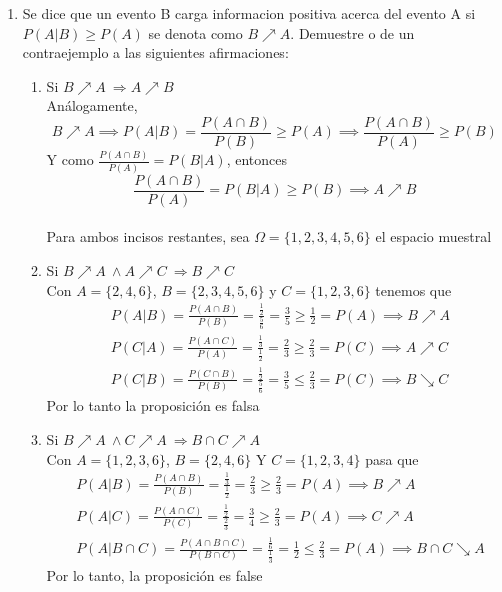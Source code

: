 \documentclass[12pt,a4paper]{report}
\begin{document}
\begin{enumerate}
{\begin{enumerate}[label=\alph*) ]
   \item {
 Se dice que un evento B carga informacion positiva acerca del evento A si
 $P(A|B) \geq P(A)$ se denota como $B \nearrow A$. Demuestre o de un contraejemplo a las siguientes afirmaciones:
 \begin{enumerate}
 \item{
 	Si $B\nearrow A \ \Rightarrow A\nearrow B$\\
	Análogamente,
	\[B \nearrow A \implies P(A|B) = \frac{P(A \cap B)}{P(B)} \geq P(A) \implies \frac{P(A \cap B)}{P(A)} \geq P(B)\]
	Y como $\frac{P(A \cap B)}{P(A)} = P(B|A)$, entonces
	\[\frac{P(A \cap B)}{P(A)} = P(B|A) \geq P(B) \implies A \nearrow B\]
	}\\

	Para ambos incisos restantes, sea $\Omega = \{1,2, 3, 4, 5, 6\}$ el espacio muestral
 \item{
 		Si $B \nearrow A \ \wedge A \nearrow C \ \Rightarrow B \nearrow C$\\
		Con $A = \{2, 4, 6\}$, $B = \{2, 3, 4, 5, 6\}$ y $C = \{1, 2, 3, 6\}$ tenemos que
		\begin{align*}
			&P(A|B) = \frac{P(A \cap B)}{P(B)} = \frac{\frac{1}{2}}{\frac{5}{6}}
			= \frac{3}{5} \geq \frac{1}{2} = P(A) \implies B \nearrow A \\
			&P(C|A) = \frac{P(A \cap C)}{P(A)} = \frac{\frac{1}{3}}{\frac{1}{2}}
			= \frac{2}{3} \geq \frac{2}{3} = P(C) \implies A \nearrow C \\
			&P(C|B) = \frac{P(C \cap B)}{P(B)} = \frac{\frac{1}{2}}{\frac{5}{6}}
			= \frac{3}{5} \leq \frac{2}{3} = P(C) \implies B \searrow C
		\end{align*}
		Por lo tanto la proposición es falsa\\
	}
 \item{
 		Si $B \nearrow A \ \wedge C \nearrow A \ \Rightarrow B\cap C \nearrow A$\\
		Con $A = \{1, 2, 3, 6\}$, $B = \{2, 4, 6\}$ Y $C = \{1, 2, 3, 4\}$ pasa que
		\begin{align*}
			&P(A|B) = \frac{P(A \cap B)}{P(B)} = \frac{\frac{1}{3}}{\frac{1}{2}}
			= \frac{2}{3} \geq \frac{2}{3} = P(A) \implies B \nearrow A\\
			&P(A|C) = \frac{P(A \cap C)}{P(C)} = \frac{\frac{1}{2}}{\frac{2}{3}}
			= \frac{3}{4} \geq \frac{2}{3} = P(A) \implies C \nearrow A\\
			&P(A|B \cap C) = \frac{P(A \cap B \cap C)}{P(B \cap C)} = \frac{\frac{1}{6}}{\frac{1}{3}}
			= \frac{1}{2} \leq \frac{2}{3} = P(A) \implies B \cap C \searrow A
		\end{align*}
		Por lo tanto, la proposición es false
	}
 \end{enumerate}

}
\end{enumerate}}
\end{enumerate}
\end{document}
